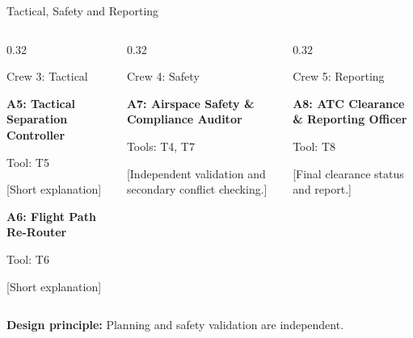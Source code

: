 

\begin{frame}{Tactical, Safety and Reporting}

\begin{columns}[T,onlytextwidth]

\begin{column}{0.32\textwidth}
\begin{block}{Crew 3: Tactical}
\scriptsize

\textbf{A5: Tactical Separation Controller}

\vspace{0.15cm}
Tool: T5

[Short explanation]

\vspace{0.3cm}

\textbf{A6: Flight Path Re-Router}

\vspace{0.15cm}
Tool: T6

[Short explanation]

\end{block}
\end{column}

\begin{column}{0.32\textwidth}
\begin{block}{Crew 4: Safety}
\scriptsize

\textbf{A7: Airspace Safety \& Compliance Auditor}

\vspace{0.15cm}
Tools: T4, T7

\vspace{0.2cm}

[Independent validation and secondary
conflict checking.]

\end{block}
\end{column}

\begin{column}{0.32\textwidth}
\begin{block}{Crew 5: Reporting}
\scriptsize

\textbf{A8: ATC Clearance \& Reporting Officer}

\vspace{0.15cm}
Tool: T8

\vspace{0.2cm}

[Final clearance status and report.]

\end{block}
\end{column}

\end{columns}

\vspace{0.3cm}

\begin{center}
\footnotesize
\textbf{Design principle:}
Planning and safety validation are independent.
\end{center}

\end{frame}
